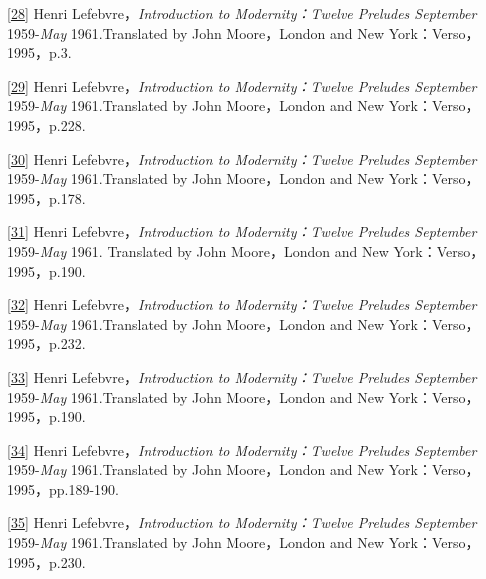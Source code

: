 \documentclass[UTF8, fontset = sourcesans, a4paper, oneside, zihao =
-4, scheme=chinese, no-math, space=true]{ctexbook}
\begin{document}
\protect\hypertarget{part0005_split_003.htmlux5cux23m28}{}{}\protect\hyperlink{part0005_split_002.htmlux5cux23w28}{{[}28{]}}
Henri Lefebvre，\emph{Introduction to Modernity：Twelve Preludes
September} 1959-\emph{May} 1961.Translated by John Moore，London and New
York：Verso，1995，p.3.

\protect\hypertarget{part0005_split_003.htmlux5cux23m29}{}{}\protect\hyperlink{part0005_split_002.htmlux5cux23w29}{{[}29{]}}
Henri Lefebvre，\emph{Introduction to Modernity：Twelve Preludes
September} 1959-\emph{May} 1961.Translated by John Moore，London and New
York：Verso，1995，p.228.

\protect\hypertarget{part0005_split_003.htmlux5cux23m30}{}{}\protect\hyperlink{part0005_split_002.htmlux5cux23w30}{{[}30{]}}
Henri Lefebvre，\emph{Introduction to Modernity：Twelve Preludes
September} 1959-\emph{May} 1961.Translated by John Moore，London and New
York：Verso，1995，p.178.

\protect\hypertarget{part0005_split_003.htmlux5cux23m31}{}{}\protect\hyperlink{part0005_split_002.htmlux5cux23w31}{{[}31{]}}
Henri Lefebvre，\emph{Introduction to Modernity：Twelve Preludes
September} 1959-\emph{May} 1961. Translated by John Moore，London and
New York：Verso，1995，p.190.

\protect\hypertarget{part0005_split_003.htmlux5cux23m32}{}{}\protect\hyperlink{part0005_split_002.htmlux5cux23w32}{{[}32{]}}
Henri Lefebvre，\emph{Introduction to Modernity：Twelve Preludes
September} 1959-\emph{May} 1961.Translated by John Moore，London and New
York：Verso，1995，p.232.

\protect\hypertarget{part0005_split_003.htmlux5cux23m33}{}{}\protect\hyperlink{part0005_split_002.htmlux5cux23w33}{{[}33{]}}
Henri Lefebvre，\emph{Introduction to Modernity：Twelve Preludes
September} 1959-\emph{May} 1961.Translated by John Moore，London and New
York：Verso，1995，p.190.

\protect\hypertarget{part0005_split_003.htmlux5cux23m34}{}{}\protect\hyperlink{part0005_split_002.htmlux5cux23w34}{{[}34{]}}
Henri Lefebvre，\emph{Introduction to Modernity：Twelve Preludes
September} 1959-\emph{May} 1961.Translated by John Moore，London and New
York：Verso，1995，pp.189-190.

\protect\hypertarget{part0005_split_003.htmlux5cux23m35}{}{}\protect\hyperlink{part0005_split_002.htmlux5cux23w35}{{[}35{]}}
Henri Lefebvre，\emph{Introduction to Modernity：Twelve Preludes
September} 1959-\emph{May} 1961.Translated by John Moore，London and New
York：Verso，1995，p.230.
\end{document}
